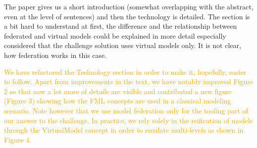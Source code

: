 \documentclass[10pt]{article}
\begin{document}
\begin{response}{The paper gives us a short introduction (somewhat overlapping with the abstract, even at the level of sentences) and then the technology is detailed. The section is a bit hard to understand at first, the difference and the relationship between federated and virtual models could be explained in more detail especially considered that the challenge solution uses virtual models only. It is not clear, how federation works in this case.}

\textcolor{orange}{We have refactored the Technology section in order to make it, hopefully, easier to follow. Apart from improvements in the text, we have notably improved Figure 2 so that now a lot more of details are visible and contributed a new figure (Figure 3) showing how the FML concepts are used in a classical modeling scenario. Note however that we use model federation only for the tooling part of our answer to the challenge. In practice, we rely solely in the reification of models through the \textsf{VirtualModel} concept in order to emulate multi-levels as shown in Figure 4.}
\end{response}
\end{document}
